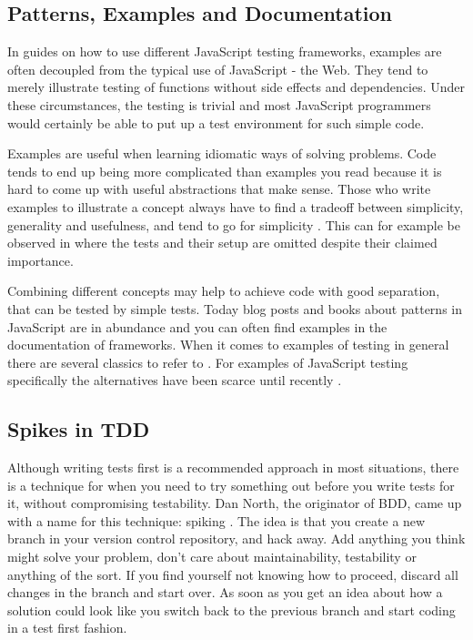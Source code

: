 \documentclass[11pt]{article}
\begin{document}
\subsection{Patterns, Examples and Documentation}
\label{sec:patternsexamples}

In guides on how to use different JavaScript testing frameworks, examples are often decoupled from the typical use of JavaScript - the Web. They tend to merely illustrate testing of functions without side effects and dependencies. Under these circumstances, the testing is trivial and most JavaScript programmers would certainly be able to put up a test environment for such simple code.

Examples are useful when learning idiomatic ways of solving problems. Code tends to end up being more complicated than examples you read because it is hard to come up with useful abstractions that make sense. Those who write examples to illustrate a concept always have to find a tradeoff between simplicity, generality and usefulness, and tend to go for simplicity \cite[questions~56-57]{Edelstam}. This can for example be observed in \cite[p.~13-45]{Refactoring} where the tests and their setup are omitted despite their claimed importance.

Combining different concepts may help to achieve code with good separation, that can be tested by simple tests. Today blog posts and books about patterns in JavaScript are in abundance and you can often find examples in the documentation of frameworks. When it comes to examples of testing in general there are several classics to refer to \cite{KentBeck}\cite{TestPatterns}. For examples of JavaScript testing specifically the alternatives have been scarce until recently \cite{Tddjs}\cite{BDDJS}\cite{TestableJS}\cite{JasmineBook}.

\subsection{Spikes in TDD}

Although writing tests first is a recommended approach in most situations, there is a technique for when you need to try something out before you write tests for it, without compromising testability. Dan North, the originator of BDD, came up with a name for this technique: spiking \cite{TwitterDanNorth}. The idea is that you create a new branch in your version control repository, and hack away. Add anything you think might solve your problem, don't care about maintainability, testability or anything of the sort. If you find yourself not knowing how to proceed, discard all changes in the branch and start over. As soon as you get an idea about how a solution could look like you switch back to the previous branch and start coding in a test first fashion. \cite[question~59]{Edelstam}
\end{document}
